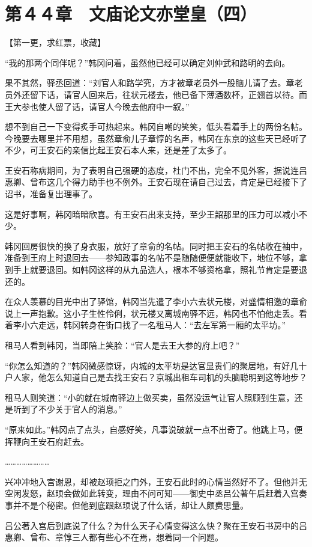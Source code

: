 \section{第４４章　文庙论文亦堂皇（四）}

【第一更，求红票，收藏】

“我的那两个同伴呢？”韩冈问着，虽然他已经可以确定刘仲武和路明的去向。

果不其然，驿丞回道：“刘官人和路学究，方才被章老员外一股脑儿请了去。章老员外还留下话，请官人回来后，往状元楼去，他已备下薄酒数杯，正翘首以待。而王大参也使人留了话，请官人今晚去他府中一叙。”

想不到自己一下变得炙手可热起来。韩冈自嘲的笑笑，低头看着手上的两份名帖。今晚要去哪里并不用想，虽然章俞儿子章惇的名声，韩冈在东京的这些天已经听了不少，可王安石的亲信比起王安石本人来，还是差了太多了。

王安石称病期间，为了表明自己强硬的态度，杜门不出，完全不见外客，据说连吕惠卿、曾布这几个得力助手也不例外。王安石现在请自己过去，肯定是已经接下了诏书，准备复出理事了。

这是好事啊，韩冈暗暗欣喜。有王安石出来支持，至少王韶那里的压力可以减小不少。

韩冈回房很快的换了身衣服，放好了章俞的名帖。同时把王安石的名帖收在袖中，准备到王府上时退回去——参知政事的名帖不是随随便便就能收下，地位不够，拿到手上就要退回。如韩冈这样的从九品选人，根本不够资格拿，照礼节肯定是要退还的。

在众人羡慕的目光中出了驿馆，韩冈当先遣了李小六去状元楼，对盛情相邀的章俞说上一声抱歉。这小子生性伶俐，状元楼又离城南驿不远，韩冈也不怕他走丢。看着李小六走远，韩冈转身在街口找了一名租马人：“去左军第一厢的太平坊。”

租马人看到韩冈，当即陪上笑脸：“官人是去王大参的府上吧？”

“你怎么知道的？”韩冈微感惊讶，内城的太平坊是达官显贵们的聚居地，有好几十户人家，他怎么知道自己是去找王安石？京城出租车司机的头脑聪明到这等地步？

租马人则笑道：“小的就在城南驿边上做买卖，虽然没运气让官人照顾到生意，还是听到了不少关于官人的消息。”

“原来如此。”韩冈点了点头，自感好笑，凡事说破就一点不出奇了。他跳上马，便挥鞭向王安石府赶去。

……………………

兴冲冲地入宫谢恩，却被赵顼拒之门外，王安石此时的心情当然好不了。但他并无空闲发怒，赵顼会做如此转变，理由不问可知——御史中丞吕公著午后赶着入宫奏事并不是个秘密。但他到底跟赵顼说了什么话，却让人颇费思量。

吕公著入宫后到底说了什么？为什么天子心情变得这么快？聚在王安石书房中的吕惠卿、曾布、章惇三人都有些心不在焉，想着同一个问题。

